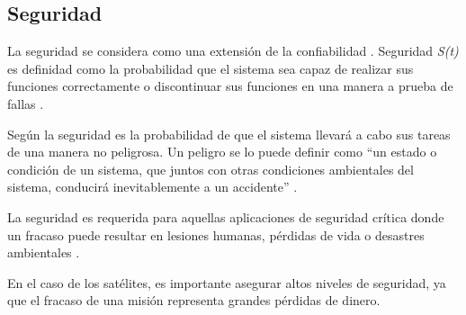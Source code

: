 \subsection{Seguridad}\label{subsec:seguridad}
La seguridad se considera como una extensión de la confiabilidad \citep{FTDesign}. Seguridad
\textit{S(t)} es definidad como la probabilidad que el sistema sea capaz de realizar sus funciones
correctamente o discontinuar sus funciones en una manera a prueba de fallas \citep{FTDesign}.

Según \cite{SoftwareFaultToleranceATutorial} la seguridad es la probabilidad de que el sistema
llevará a cabo sus tareas de una manera no peligrosa. Un peligro se lo puede definir como ``un
estado o condición de un sistema, que juntos con otras condiciones ambientales del sistema,
conducirá inevitablemente a un accidente'' \citep{SoftwareFaultToleranceATutorial}.

La seguridad es requerida para aquellas aplicaciones de seguridad crítica donde un fracaso puede
resultar en lesiones humanas, pérdidas de vida o desastres ambientales \citep{FTDesign}.

En el caso de los satélites, es importante asegurar altos niveles de seguridad, ya que
el fracaso de una misión representa grandes pérdidas de dinero. 
